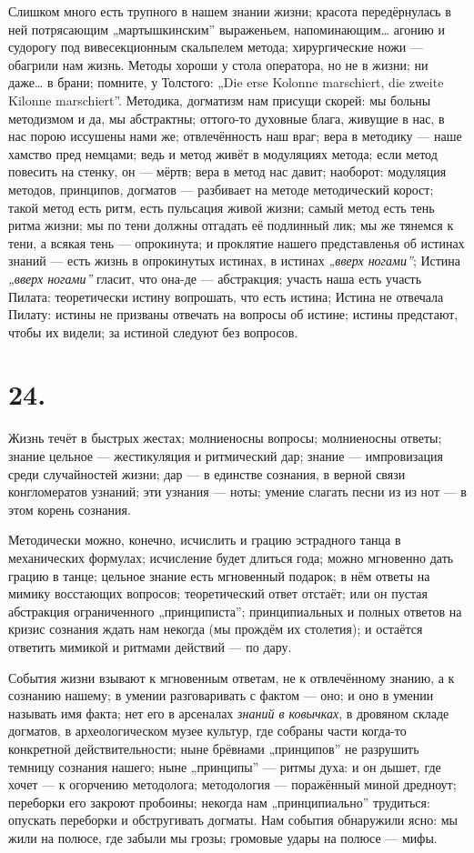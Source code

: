 \documentclass[12pt,a4paper,oneside]{book}
\begin{document}
Слишком много есть трупного в нашем знании жизни; красота передёрнулась в ней потрясающим „мартышкинским” выраженьем, напоминающим… агонию и судорогу под вивесекционным скальпелем метода; хирургические ножи — обагрили нам жизнь. Методы хороши у стола оператора, но не в жизни; ни даже… в брани; помните, у Толстого: „Die erse Kolonne marschiert, die zweite Kilonne marschiert”. Методика, догматизм нам присущи скорей: мы больны методизмом и да, мы абстрактны; оттого-то духовные блага, живущие в нас, в нас порою иссушены нами же; отвлечённость наш враг; вера в методику — наше хамство пред немцами; ведь и метод живёт в модуляциях метода; если метод повесить на стенку, он — мёртв; вера в метод нас давит; наоборот: модуляция методов, принципов, догматов — разбивает на методе методический корост; такой метод есть ритм, есть пульсация живой жизни; самый метод есть тень ритма жизни; мы по тени должны отгадать её подлинный лик; мы же тянемся к тени, а всякая тень — опрокинута; и проклятие нашего представленья об истинах знаний — есть жизнь в опрокинутых истинах, в истинах \emph{„вверх ногами”}; Истина \emph{„вверх ногами”} гласит, что она-де — абстракция; участь наша есть участь Пилата: теоретически истину вопрошать, что есть истина; Истина не отвечала Пилату: истины не призваны отвечать на вопросы об истине; истины предстают, чтобы их видели; за истиной следуют без вопросов.

\section*{24.}

Жизнь течёт в быстрых жестах; молниеносны вопросы; молниеносны ответы; знание цельное — жестикуляция и ритмический дар; знание — импровизация среди случайностей жизни; дар — в единстве сознания, в верной связи конгломератов узнаний; эти узнания — ноты; умение слагать песни из из нот — в этом корень сознания.

Методически можно, конечно, исчислить и грацию эстрадного танца в механических формулах; исчисление будет длиться года; можно мгновенно дать грацию в танце; цельное знание есть мгновенный подарок; в нём ответы на мимику восстающих вопросов; теоретический ответ отстаёт; или он пустая абстракция ограниченного „принциписта”; принципиальных и полных ответов на кризис сознания ждать нам некогда (мы прождём их столетия); и остаётся ответить мимикой и ритмами действий — по дару.

События жизни взывают к мгновенным ответам, не к отвлечённому знанию, а к сознанию нашему; в умении разговаривать с фактом — оно; и оно в умении называть имя факта; нет его в арсеналах \emph{знаний в ковычках}, в дровяном складе догматов, в археологическом музее культур, где собраны части когда-то конкретной действительности; ныне брёвнами „принципов” не разрушить темницу сознания нашего; ныне „принципы” — ритмы духа: и он дышет, где хочет — к огорчению методолога; методология — поражённый миной дредноут; переборки его закроют пробоины; некогда нам „принципиально” трудиться: опускать переборки и обстругивать догматы. Нам события обнаружили ясно: мы жили на полюсе, где забыли мы грозы; громовые удары на полюсе — мифы.
\end{document}
